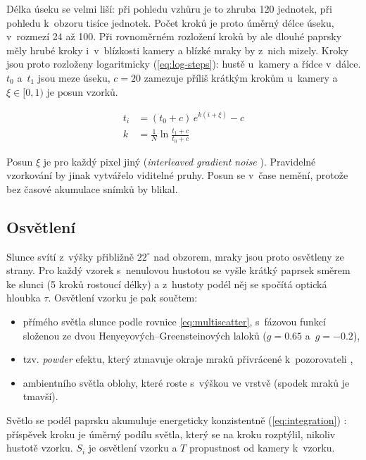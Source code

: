 \documentclass[a4paper, 12pt]{article}
\begin{document}
Délka úseku se velmi liší: při pohledu vzhůru je to zhruba 120 jednotek, při
pohledu k~obzoru tisíce jednotek. Počet kroků je proto úměrný délce úseku,
v~rozmezí 24 až 100. Při rovnoměrném rozložení kroků by ale dlouhé paprsky měly
hrubé kroky i~v~blízkosti kamery a blízké mraky by z~nich mizely. Kroky jsou
proto rozloženy logaritmicky (\ref{eq:log-steps}): hustě u~kamery a řídce
v~dálce. $t_0$ a~$t_1$ jsou meze úseku, $c = 20$ zamezuje příliš krátkým krokům
u~kamery a $\xi \in [0, 1)$ je posun vzorků.

\begin{equation}
  \begin{aligned}
    t_i & = (t_0 + c) \, e^{k(i + \xi)} - c \\
    k & = \frac{1}{N} \ln \frac{t_1 + c}{t_0 + c}
  \end{aligned}
  \label{eq:log-steps}
\end{equation}

Posun $\xi$ je pro každý pixel jiný (\textit{interleaved gradient noise}
\cite{jimenez2014}). Pravidelné vzorkování by jinak vytvářelo viditelné pruhy.
Posun se v~čase nemění, protože bez časové akumulace snímků by blikal.

\subsection{Osvětlení}

Slunce svítí z~výšky přibližně $22^\circ$ nad obzorem, mraky jsou proto
osvětleny ze strany. Pro každý vzorek s~nenulovou hustotou se vyšle krátký
paprsek směrem ke slunci (5 kroků rostoucí délky) a z~hustoty podél něj se
spočítá optická hloubka $\tau$. Osvětlení vzorku je pak součtem:

\begin{itemize}
  \item přímého světla slunce podle rovnice \ref{eq:multiscatter}, s~fázovou
    funkcí složenou ze dvou Henyeyových--Greensteinových laloků
    ($g = 0.65$ a~$g = -0.2$),
  \item tzv. \textit{powder} efektu, který ztmavuje okraje mraků přivrácené
    k~pozorovateli \cite{schneider2015},
  \item ambientního světla oblohy, které roste s~výškou ve vrstvě
    (spodek mraků je tmavší).
\end{itemize}

Světlo se podél paprsku akumuluje energeticky konzistentně
(\ref{eq:integration}) \cite{hillaire2016}: příspěvek kroku je úměrný podílu
světla, který se na kroku rozptýlil, nikoliv hustotě vzorku. $S_i$ je osvětlení
vzorku a $T$ propustnost od kamery k~vzorku.
\end{document}
